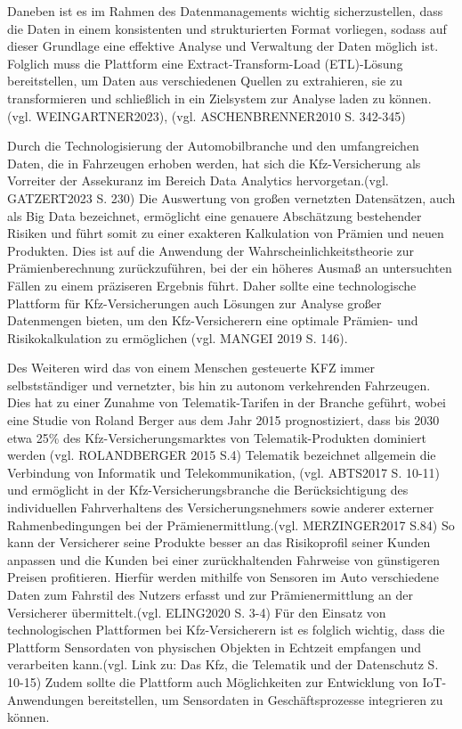 Daneben ist es im Rahmen des Datenmanagements wichtig sicherzustellen, dass die Daten in einem konsistenten und strukturierten Format vorliegen, sodass auf dieser Grundlage eine effektive Analyse und Verwaltung der Daten möglich ist. Folglich muss die Plattform eine Extract-Transform-Load (ETL)-Lösung bereitstellen, um Daten aus verschiedenen Quellen zu extrahieren, sie zu transformieren und schließlich in ein Zielsystem zur Analyse laden zu können. (vgl. WEINGARTNER2023), (vgl. ASCHENBRENNER2010 S. 342-345)

Durch die Technologisierung der Automobilbranche und den umfangreichen Daten, die in Fahrzeugen erhoben werden, hat sich die Kfz-Versicherung als Vorreiter der Assekuranz im Bereich Data Analytics hervorgetan.(vgl. GATZERT2023 S. 230) Die Auswertung von großen vernetzten Datensätzen, auch als Big Data bezeichnet, ermöglicht eine genauere Abschätzung bestehender Risiken und führt somit zu einer exakteren Kalkulation von Prämien und neuen Produkten. Dies ist auf die Anwendung der Wahrscheinlichkeitstheorie zur Prämienberechnung zurückzuführen, bei der ein höheres Ausmaß an untersuchten Fällen zu einem präziseren Ergebnis führt. Daher sollte eine technologische Plattform für Kfz-Versicherungen auch Lösungen zur Analyse großer Datenmengen bieten, um den Kfz-Versicherern eine optimale Prämien- und Risikokalkulation zu ermöglichen (vgl. MANGEI 2019 S. 146).

Des Weiteren wird das von einem Menschen gesteuerte KFZ immer selbstständiger und vernetzter, bis hin zu autonom verkehrenden Fahrzeugen. Dies hat zu einer Zunahme von Telematik-Tarifen in der Branche geführt, wobei eine Studie von Roland Berger aus dem Jahr 2015 prognostiziert, dass bis 2030 etwa 25\% des Kfz-Versicherungsmarktes von Telematik-Produkten dominiert werden (vgl. ROLANDBERGER 2015 S.4) Telematik bezeichnet allgemein die Verbindung von Informatik und Telekommunikation, (vgl. ABTS2017 S. 10-11) und ermöglicht in der Kfz-Versicherungsbranche die Berücksichtigung des individuellen Fahrverhaltens des Versicherungsnehmers sowie anderer externer Rahmenbedingungen bei der Prämienermittlung.(vgl. MERZINGER2017 S.84) So kann der Versicherer seine Produkte besser an das Risikoprofil seiner Kunden anpassen und die Kunden bei einer zurückhaltenden Fahrweise von günstigeren Preisen profitieren. Hierfür werden mithilfe von Sensoren im Auto verschiedene Daten zum Fahrstil des Nutzers erfasst und zur Prämienermittlung an der Versicherer übermittelt.(vgl. ELING2020 S. 3-4) Für den Einsatz von technologischen Plattformen bei Kfz-Versicherern ist es folglich wichtig, dass die Plattform Sensordaten von physischen Objekten in Echtzeit empfangen und verarbeiten kann.(vgl. Link zu: Das Kfz, die Telematik und der Datenschutz S. 10-15) Zudem sollte die Plattform auch Möglichkeiten zur Entwicklung von IoT-Anwendungen bereitstellen, um Sensordaten in Geschäftsprozesse integrieren zu können.

